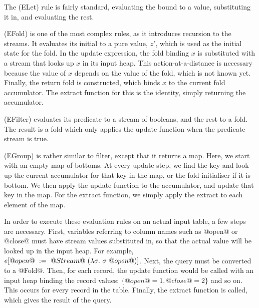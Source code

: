 The (ELet) rule is fairly standard, evaluating the bound to a value, substituting it in, and evaluating the rest.

(EFold) is one of the most complex rules, as it introduces recursion to the streams.
It evaluates its initial to a pure value, $z'$, which is used as the initial state for the fold.
In the update expression, the fold binding $x$ is substituted with a stream that looks up $x$ in its input heap.
This action-at-a-distance is necessary because the value of $x$ depends on the value of the fold, which is not known yet.
Finally, the return fold is constructed, which binds $x$ to the current fold accumulator.
The extract function for this is the identity, simply returning the accumulator.

(EFilter) evaluates its predicate to a stream of booleans, and the rest to a fold.
The result is a fold which only applies the update function when the predicate stream is true.

(EGroup) is rather similar to filter, except that it returns a map.
Here, we start with an empty map of bottoms.
At every update step, we find the key and look up the current accumulator for that key in the map, or the fold initialiser if it is bottom.
We then apply the update function to the accumulator, and update that key in the map.
For the extract function, we simply apply the extract to each element of the map.

In order to execute these evaluation rules on an actual input table, a few steps are necessary.
First, variables referring to column names such as @open@ or @close@ must have stream values substituted in, so that the actual value will be looked up in the input heap.
For example, $e[@open@~:=~@Stream@~(\lambda{}\sigma.~ \sigma~@open@)]$.
Next, the query must be converted to a @Fold@.
Then, for each record, the update function would be called with an input heap binding the record values: $\{@open@ = 1, @close@ = 2\}$ and so on.
This occurs for every record in the table.
Finally, the extract function is called, which gives the result of the query.

